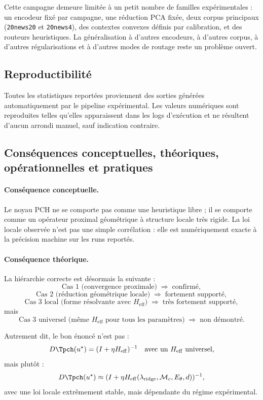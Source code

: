 Cette campagne demeure limitée à un petit nombre de familles expérimentales :
un encodeur fixé par campagne, une réduction PCA fixée, deux corpus principaux (\texttt{20news20} et \texttt{20news4}), des contextes convexes définis par calibration, et des routeurs heuristiques. La généralisation à d’autres encodeurs, à d’autres corpus, à d’autres régularisations et à d’autres modes de routage reste un problème ouvert.


\subsection{Reproductibilité}

Toutes les statistiques reportées proviennent des sorties
générées automatiquement par le pipeline expérimental.
Les valeurs numériques sont reproduites telles qu'elles
apparaissent dans les logs d'exécution et ne résultent
d'aucun arrondi manuel, sauf indication contraire.

\subsection{Conséquences conceptuelles, théoriques, opérationnelles et pratiques}

\paragraph{Conséquence conceptuelle.}
Le noyau PCH ne se comporte pas comme une heuristique libre ; il se comporte comme un opérateur proximal géométrique à structure locale très rigide.
La loi locale observée n’est pas une simple corrélation : elle est numériquement exacte à la précision machine sur les runs reportés.

\paragraph{Conséquence théorique.}
La hiérarchie correcte est désormais la suivante :
\[
\text{Cas 1 (convergence proximale)} \;\Rightarrow\; \text{confirmé},
\]
\[
\text{Cas 2 (réduction géométrique locale)} \;\Rightarrow\; \text{fortement supporté},
\]
\[
\text{Cas 3 local (forme résolvante avec }H_{\mathrm{eff}}\text{)} \;\Rightarrow\; \text{très fortement supporté},
\]
mais
\[
\text{Cas 3 universel (même }H_{\mathrm{eff}}\text{ pour tous les paramètres)} \;\Rightarrow\; \text{non démontré}.
\]

Autrement dit, le bon énoncé n’est pas :
\[
D\Tpch(u^\star)=(I+\eta H_{\mathrm{eff}})^{-1}
\quad\text{avec un }H_{\mathrm{eff}}\text{ universel},
\]
mais plutôt :
\[
D\Tpch(u^\star)\approx (I+\eta H_{\mathrm{eff}}(\lambda_{\mathrm{ridge}},\mathcal M_c,E_\theta,d))^{-1},
\]
avec une loi locale extrêmement stable, mais dépendante du régime expérimental.

